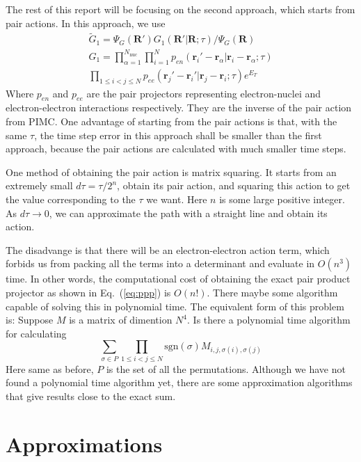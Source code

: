 \documentclass[aps,prl,reprint,groupedaddress]{revtex4-1}
\begin{document}
The rest of this report will be focusing on the second approach, which starts from pair actions.
In this approach, we use
\begin{align}
\label{eq:G1ppp}
\widetilde{G}_1 = \Psi_G(\bm{R'})G_1(\bm{R'}|\bm{R};\tau)/\Psi_G(\bm{R})\\
G_1 =
\prod\limits_{\alpha = 1}^{N_{\mathrm{nuc}}}\prod\limits_{i=1}^{N}
p_{en}(\bm{r}_i'-\bm{r}_\alpha|\bm{r}_i-\bm{r}_\alpha;\tau)\\
\prod\limits_{1\leq i < j \leq N}p_{ee}(\bm{r}_j'-\bm{r}_i'|\bm{r}_j-\bm{r}_i;\tau)
e^{E_T}
\end{align}
Where $p_{en}$ and $p_{ee}$ are the pair projectors representing electron-nuclei and electron-electron interactions respectively.
They are the inverse of the pair action from PIMC.
One advantage of starting from the pair actions is that, with the same $\tau$, the time step error in this approach shall be smaller than the first approach, because the pair actions are calculated with much smaller time steps.

One method of obtaining the pair action is matrix squaring.
It starts from an extremely small $d\tau = \tau/2^n$, obtain its pair action, and squaring this action to get the value corresponding to the $\tau$ we want.
Here $n$ is some large positive integer.
As $d\tau \to 0$, we can approximate the path with a straight line and obtain its action.

The disadvange is that there will be an electron-electron action term, which forbids us from packing all the terms into a determinant and evaluate in $O(n^3)$ time.
In other words, the computational cost of obtaining the exact pair product projector as shown in Eq.~(\ref{eq:ppp}) is $O(n!)$.
There maybe some algorithm capable of solving this in polynomial time.
The equivalent form of this problem is:
Suppose $M$ is a matrix of dimention $N^4$.
Is there a polynomial time algorithm for calculating
\begin{equation}
\label{eq:algo}
\sum\limits_{\sigma \in P}\prod\limits_{1\leq i < j \leq N}\mathrm{sgn}(\sigma)M_{i,j,\sigma(i),\sigma(j)}
\end{equation}
Here same as before, $P$ is the set of all the permutations.
Although we have not found a polynomial time algorithm yet, there are some approximation algorithms that give results close to the exact sum.

\section{Approximations}
\end{document}
